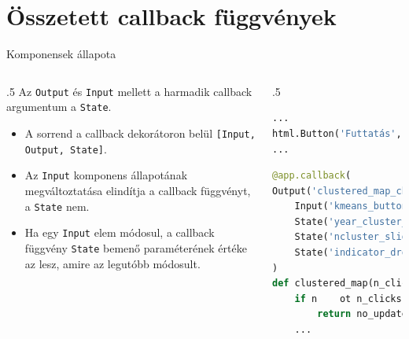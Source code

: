 \documentclass[english, aspectratio=169]{beamer}
\makeatletter
\let\origtableofcontents=\tableofcontents
\def\tableofcontents{\@ifnextchar[{\origtableofcontents}{\gobbletableofcontents}}
\def\gobbletableofcontents#1{\origtableofcontents}
\makeatother
\begin{document}
	\section{Összetett callback függvények}
	
	\begin{frame}{}
		\tableofcontents[currentsection]
	\end{frame}
	
	\begin{frame}[fragile]{Komponensek állapota}
		\begin{columns}
			\begin{column}{.5\textwidth}
				Az \texttt{Output} és \texttt{Input} mellett a harmadik callback argumentum a \texttt{State}. 
				\begin{itemize}
					\item A sorrend a callback dekorátoron belül \texttt{[Input, Output, State]}.
					\item Az \texttt{Input} komponens állapotának megváltoztatása elindítja a callback függvényt, a \texttt{State} nem. 
					\item Ha egy \texttt{Input} elem módosul, a callback függvény \texttt{State} bemenő paraméterének értéke az lesz, amire az legutóbb módosult. 
				\end{itemize}
			\end{column}
			\begin{column}{.5\textwidth}
				\begin{lstlisting}[language=python]
...
html.Button('Futtatás', id='kmeans_button')
...
				\end{lstlisting}
				\begin{lstlisting}[language=python]
@app.callback(
Output('clustered_map_chart', 'figure'),
	Input('kmeans_button', 'n_clicks'),
	State('year_cluster_slider', 'value'),
	State('ncluster_slider', 'value'),
	State('indicator_dropdown', 'value'),
)
def clustered_map(n_clicks, year, n_clusters, indicator):
	if n	ot n_clicks:
		return no_update
	...
				\end{lstlisting}
			\end{column}
		\end{columns}	
	\end{frame}
	
\end{document}
